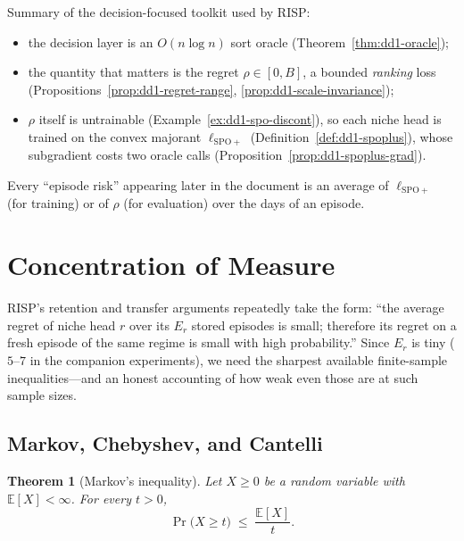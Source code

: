 \documentclass[11pt,a4paper]{article}
\theoremstyle{definition}
\theoremstyle{plain}
\newtheorem{theorem}{Theorem}[section]
\newcommand{\E}{\mathbb{E}}
\newcommand{\nm}{\textsc{RISP}}
\begin{document}
\begin{keypoint}
Summary of the decision-focused toolkit used by \nm{}:
\begin{itemize}
\item the decision layer is an $O(n \log n)$ sort oracle
      (Theorem~\ref{thm:dd1-oracle});
\item the quantity that matters is the regret
      $\rho \in [0, B]$, a bounded \emph{ranking} loss
      (Propositions~\ref{prop:dd1-regret-range},
      \ref{prop:dd1-scale-invariance});
\item $\rho$ itself is untrainable
      (Example~\ref{ex:dd1-spo-discont}), so each niche head is trained on
      the convex majorant $\ell_{\mathrm{SPO+}}$
      (Definition~\ref{def:dd1-spoplus}), whose subgradient costs two oracle
      calls (Proposition~\ref{prop:dd1-spoplus-grad}).
\end{itemize}
Every ``episode risk'' appearing later in the document is an average of
$\ell_{\mathrm{SPO+}}$ (for training) or of $\rho$ (for evaluation) over the
days of an episode.
\end{keypoint}

\section{Concentration of Measure}
\label{sec:dd1-concentration}

\nm{}'s retention and transfer arguments repeatedly take the form: ``the
average regret of niche head $r$ over its $E_r$ stored episodes is small;
therefore its regret on a fresh episode of the same regime is small with high
probability.'' Since $E_r$ is tiny ($5$--$7$ in the companion experiments),
we need the sharpest available finite-sample inequalities---and an honest
accounting of how weak even those are at such sample sizes.

\subsection{Markov, Chebyshev, and Cantelli}

\begin{theorem}[Markov's inequality]
\label{thm:dd1-markov}
Let $X \ge 0$ be a random variable with $\E[X] < \infty$. For every $t > 0$,
\begin{equation}
\label{eq:dd1-markov}
\Pr\bigl( X \ge t \bigr) \;\le\; \frac{\E[X]}{t}.
\end{equation}
\end{theorem}
\end{document}
